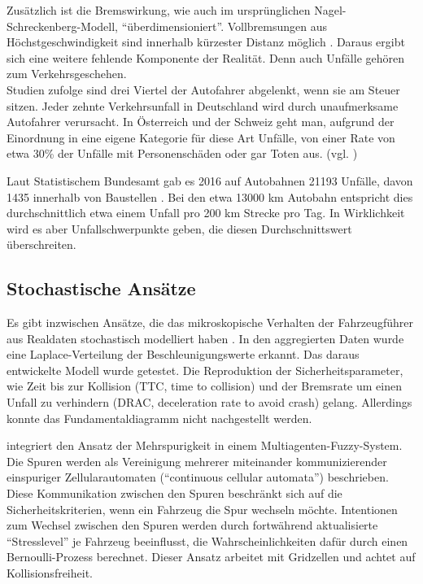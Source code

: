 Zusätzlich ist die Bremswirkung, wie auch im ursprünglichen Nagel-Schreckenberg-Modell, \enquote{über\-di\-men\-sio\-niert}. 
Vollbremsungen aus Höchstgeschwindigkeit sind innerhalb kürzester Distanz möglich \cite{acc-free}.
Daraus ergibt sich eine weitere fehlende Komponente der Realität.
Denn auch Unfälle gehören zum Verkehrsgeschehen. \\
Studien zufolge sind drei Viertel der Autofahrer abgelenkt, wenn sie am Steuer sitzen. 
Jeder zehnte Verkehrsunfall in Deutschland wird durch unaufmerksame Autofahrer verursacht. 
In Österreich und der Schweiz geht man, aufgrund der Einordnung in eine eigene Kategorie für diese Art Unfälle, von einer Rate von etwa 30\% der Unfälle mit Personenschäden oder gar Toten aus. (vgl. \cite{dvr-studie})

Laut Statistischem Bundesamt gab es 2016 auf Autobahnen 21193 Unfälle, davon 1435 innerhalb von Baustellen \cite{unf2016}. 
Bei den etwa 13000 km Autobahn \cite{autob2016} entspricht dies durchschnittlich etwa einem Unfall pro 200 km Strecke pro Tag. 
In Wirklichkeit wird es aber Unfallschwerpunkte geben, die diesen Durchschnittswert überschreiten.



\subsection{Stochastische Ansätze}
\label{sec:stochastic-approaches}

Es gibt inzwischen Ansätze, die das mikroskopische Verhalten der Fahrzeugführer aus Realdaten  stochastisch modelliert haben \cite{stoch-carfollow}. 
In den aggregierten Daten wurde eine Laplace-Verteilung der Beschleunigungswerte erkannt. 
Das daraus entwickelte Modell wurde getestet. 
Die Reproduktion der Sicherheitsparameter, wie Zeit bis zur Kollision (TTC, time to collision) und der Bremsrate um einen Unfall zu verhindern (DRAC, deceleration rate to avoid crash) gelang. 
Allerdings konnte das Fundamentaldiagramm nicht nachgestellt werden.

\cite{multi-fuzzy} integriert den Ansatz der Mehrspurigkeit in einem Multiagenten-Fuzzy-System. 
Die Spuren werden als Vereinigung mehrerer miteinander kommunizierender einspuriger Zellularautomaten (\enquote{continuous cellular automata}) beschrieben. 
Diese Kommunikation zwischen den Spuren beschränkt sich auf die Sicherheitskriterien, wenn ein Fahrzeug die Spur wechseln möchte. 
Intentionen zum Wechsel zwischen den Spuren werden durch fortwährend aktualisierte \enquote{Stresslevel} je Fahrzeug beeinflusst, die Wahrscheinlichkeiten dafür durch einen Bernoulli-Prozess berechnet.
Dieser Ansatz arbeitet mit Gridzellen und achtet auf Kollisionsfreiheit.



